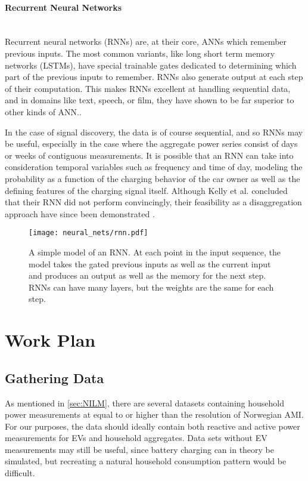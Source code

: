 \documentclass[12pt, american]{article}
\begin{document}
\paragraph{Recurrent Neural Networks}\mbox{}\\

\noindent 
Recurrent neural networks (RNNs) are, at their core, ANNs which remember previous inputs. The most common variants, like long short term memory networks (LSTMs), have special trainable gates dedicated to determining which part of the previous inputs to remember. RNNs also generate output at each step of their computation. This makes RNNs excellent at handling sequential data, and in domains like text, speech, or film, they have shown to be far superior to other kinds of ANN.\cite{Lecun2015}.

In the case of signal discovery, the data is of course sequential, and so RNNs may be useful, especially in the case where the aggregate power series consist of days or weeks of contiguous measurements. It is possible that an RNN can take into consideration temporal variables such as frequency and time of day, modeling the probability as a function of the charging behavior of the car owner as well as the defining features of the charging signal itself. Although Kelly et al. \cite{Kelly2015c} concluded that their RNN did not perform convincingly, their feasibility as a disaggregation approach have since been demonstrated \cite{Mauch2016}.

\begin{figure}[h]
\centering
\caption{A simple model of an RNN. At each point in the input sequence, the model takes the gated previous inputs as well as the current input and produces an output as well as the memory for the next step. RNNs can have many layers, but the weights are the same for each step.}
\texttt{[image: neural\_nets/rnn.pdf]}
\label{fig:rnn}
\end{figure}

\section{Work Plan}
\subsection{Gathering Data}
As mentioned in \autoref{sec:NILM}, there are several datasets containing household power measurements at equal to or higher than the resolution of Norwegian AMI. For our purposes, the data should ideally contain both reactive and active power measurements for EVs and household aggregates. Data sets without EV measurements may still be useful, since battery charging can in theory be simulated, but recreating a natural household consumption pattern would be difficult.
\end{document}
